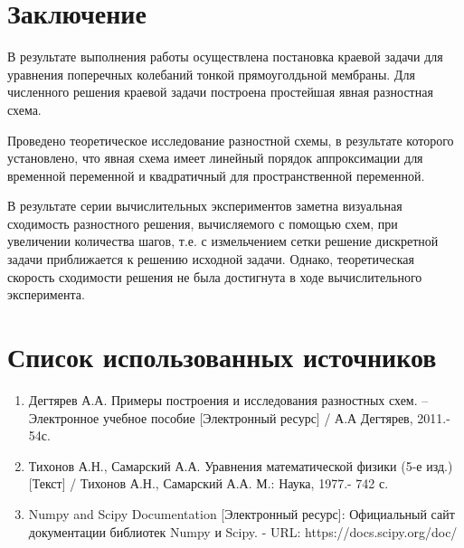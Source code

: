 {\titleformat{\section}{\large\bfseries\centering}{\thesection}{0.5em}{\MakeUppercase}
\section*{Заключение}
{
	В результате выполнения работы осуществлена постановка краевой
задачи для уравнения поперечных колебаний тонкой прямоуголдьной мембраны. Для
численного решения краевой задачи построена простейшая явная разностная схема.

Проведено теоретическое исследование разностной схемы, в результате
которого установлено, что явная схема имеет линейный
порядок аппроксимации для временной переменной и квадратичный для
пространственной переменной.

 
В результате серии вычислительных экспериментов заметна визуальная
сходимость разностного решения, вычисляемого с помощью схем, при
увеличении количества шагов, т.е. с измельчением сетки решение дискретной
задачи приближается к решению исходной задачи. Однако, теоретическая скорость 
сходимости решения не была достигнута в ходе вычислительного эксперимента.
}

\newpage

\section*{Список использованных источников}
{
	\begin{enumerate}[label=\arabic*\ \ ]
	\item {Дегтярев А.А. Примеры построения и исследования разностных схем. – Электронное учебное пособие [Электронный ресурс] / А.А Дегтярев, 2011.- 54с.}
	\item {Тихонов А.Н., Самарский А.А. Уравнения математической физики (5-е изд.) [Текст] / Тихонов А.Н., Самарский А.А. М.: Наука, 1977.- 742 с.}
	
	\item {Numpy and Scipy Documentation [Электронный ресурс]: Официальный сайт документации библиотек Numpy и Scipy. - URL: https://docs.scipy.org/doc/}
	

\end{enumerate}}}
